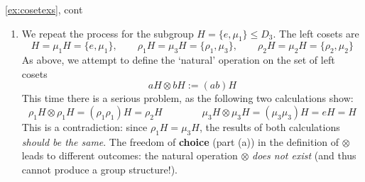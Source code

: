 \begin{examples*}{\ref{ex:cosetexs}, cont}{}
\begin{enumerate}
		
		
	
		\item We repeat the process for the subgroup $H=\{e,\mu_1\}\le D_3$. The left cosets are
		\[
			H=\mu_1H=\{e,\mu_1\},\qquad
			\rho_1H=\mu_3H=\{\rho_1,\mu_3\},\qquad
			\rho_2H=\mu_2H=\{\rho_2,\mu_2\}
		\]
		As above, we attempt to define the `natural' operation on the set of left cosets
		\[
			aH\otimes bH:=(ab)H \tag{$ab$ is composition/multiplication within $D_3$}
		\]
		This time there is a serious problem, as the following two calculations show:
		\[
			\rho_1H\otimes\rho_1H =(\rho_1\rho_1)H =\rho_2H\qquad\qquad
			\mu_3H\otimes \mu_3H=(\mu_3\mu_3)H =eH =H
		\]
		This is a contradiction: since $\rho_1H=\mu_3H$, the results of both calculations \emph{should be the same}. The freedom of \textbf{choice} (part (a)) in the definition of $\otimes$ leads to different outcomes: the natural operation $\otimes$ \emph{does not exist} (and thus cannot produce a group structure!).
	\end{enumerate}
\end{examples*}



